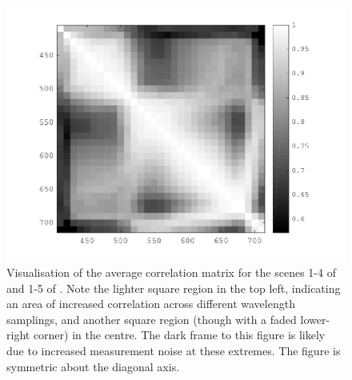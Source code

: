 \begin{figure}[htbp]
 \includegraphics[max width=\textwidth]{figs/comp/nat_cor/foster.pdf}
 \caption{Visualisation of the average correlation matrix for the scenes 1-4 of \citet{nascimento_statistics_2002} and 1-5 of \citet{foster_frequency_2006}. Note the lighter square region in the top left, indicating an area of increased correlation across different wavelength samplings, and another square region (though with a faded lower-right corner) in the centre. The dark frame to this figure is likely due to increased measurement noise at these extremes. The figure is symmetric about the diagonal axis.}
 \label{fig:foster}
\end{figure} %


